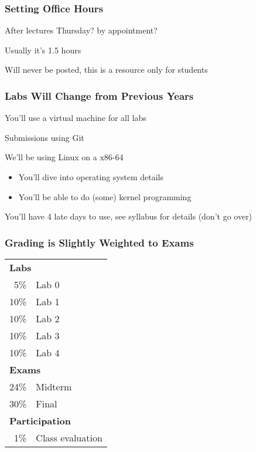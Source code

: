   \begin{frame}
    \frametitle{Setting Office Hours}

    After lectures Thursday? by appointment?

    \vspace{2em}

    Usually it's 1.5 hours

    \vspace{2em}

    Will never be posted, this is a resource only for students
  \end{frame}

  \begin{frame}
    \frametitle{Labs Will Change from Previous Years}

    You'll use a virtual machine for all labs

    \vspace{2em}

    Submissions using Git

    \vspace{2em}

    We'll be using Linux on a x86-64

    \begin{itemize}
      \item You'll dive into operating system details
      \item You'll be able to do (some) kernel programming
    \end{itemize}

    \vspace{2em}

    You'll have 4 late days to use, see syllabus for details (don't go over)
  \end{frame}

  \begin{frame}
    \frametitle{Grading is Slightly Weighted to Exams}

    \begin{tabular}{rl}
      \multicolumn{2}{l}{\bfseries Labs} \\
       5\% & Lab 0 \\
      10\% & Lab 1 \\
      10\% & Lab 2 \\
      10\% & Lab 3 \\
      10\% & Lab 4 \\
      \multicolumn{2}{l}{\bfseries Exams} \\
      24\% & Midterm \\
      30\% & Final \\
      \multicolumn{2}{l}{\bfseries Participation} \\
       1\% & Class evaluation \\
    \end{tabular}
  \end{frame}


